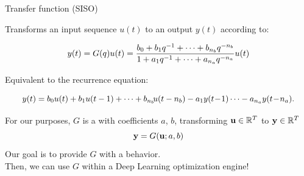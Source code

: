 \documentclass{beamer}
\begin{document}
\begin{frame}{Transfer function (SISO)}

Transforms an input sequence $u(t)$ to an output $y(t)$ according to:
\begin{footnotesize}
	$$y(t) = G(q)u(t) = \frac{b_0 + b_1 q^{-1} + \dots + b_{n_{b}}q^{-n_{b}}}{1 + a_1 q^{-1} + \dots + a_{n_a}q^{-n_a}} u(t)$$
\end{footnotesize}
Equivalent to the recurrence equation:
\begin{footnotesize}
$$ y(t) = b_0 u(t) + b_1 u(t-1) + \dots + b_{n_b}\!u(t-n_b)-a_1 y(t\!-\!1) \dots - a_{n_a} y(t\!-\!n_a).$$
\end{footnotesize}

\pause

For our purposes, $G$ is a  with coefficients $a$, $b$, transforming $\mathbf{u} \in \mathbb{R}^T$ to $\mathbf{y} \in \mathbb{R}^T$
$$
 \mathbf{y} = G(\mathbf{u}; a, b)
$$
\pause
Our goal is to provide $G$ with a  behavior.\\
Then, we can use $G$ within a Deep Learning optimization engine!
\end{frame}

\end{document}
